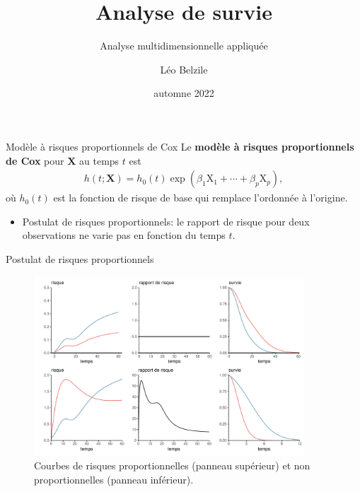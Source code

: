 \documentclass[
  ignorenonframetext,
]{beamer}
\title{Analyse de survie}
\subtitle{Analyse multidimensionnelle appliquée}
\author{Léo Belzile}
\date{automne 2022}
\institute{HEC Montréal}
\providecommand{\tightlist}{%
  \setlength{\itemsep}{0pt}\setlength{\parskip}{0pt}}\usepackage{longtable,booktabs,array}
\begin{document}
\frame{\titlepage}
\ifdefined\Shaded\renewenvironment{Shaded}{\begin{tcolorbox}[boxrule=0pt, borderline west={3pt}{0pt}{shadecolor}, sharp corners, breakable, interior hidden, enhanced, frame hidden]}{\end{tcolorbox}}\fi

\begin{frame}{Modèle à risques proportionnels de Cox}
\protect\hypertarget{moduxe8le-uxe0-risques-proportionnels-de-cox}{}
Le \textbf{modèle à risques proportionnels de Cox} pour \(\mathbf{X}\)
au temps \(t\) est \begin{align*}
h(t; \mathbf{X}) = h_0(t)\exp(\beta_1\mathrm{X}_1 + \cdots + \beta_p \mathrm{X}_p),
\end{align*} où \(h_0(t)\) est la fonction de risque de base qui
remplace l'ordonnée à l'origine.

\begin{itemize}
\tightlist
\item
  Postulat de risques proportionnels: le rapport de risque pour deux
  observations ne varie pas en fonction du temps \(t\).
\end{itemize}
\end{frame}

\begin{frame}{Postulat de risques proportionnels}
\protect\hypertarget{postulat-de-risques-proportionnels}{}
\begin{figure}

{\centering \includegraphics[width=0.9\textwidth,height=\textheight]{MATH60602-diapos10_files/figure-beamer/fig-risquepropfig-1.pdf}

}

\caption{\label{fig-risquepropfig}Courbes de risques proportionnelles
(panneau supérieur) et non proportionnelles (panneau inférieur).}

\end{figure}
\end{frame}
\end{document}
